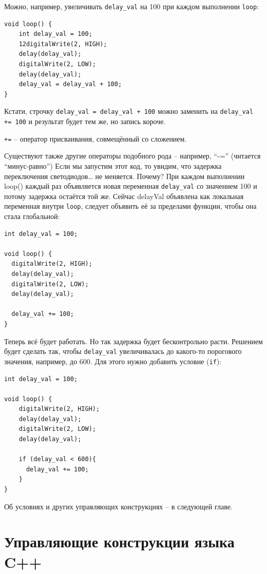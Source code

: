 \documentclass[a4paper,twoside]{book}
\begin{document}
Можно, например, увеличивать \texttt{delay\_val} на 100 при каждом выполнении
\texttt{loop}:

\begin{verbatim}
void loop() {
    int delay_val = 100;
    12digitalWrite(2, HIGH);
    delay(delay_val);
    digitalWrite(2, LOW);
    delay(delay_val);
    delay_val = delay_val + 100;
}
\end{verbatim}

Кстати, строчку \texttt{delay\_val = delay\_val + 100} можно заменить на
\texttt{delay\_val += 100} и результат будет тем же, но запись короче.

\texttt{+=} -- оператор присваивания, совмещённый со сложением.

Существуют также другие операторы подобного рода -- например, ``-=''
(читается ``минус-равно'') Если мы запустим этот код, то увидим, что задержка
переключения светодиодов… не меняется. Почему? При каждом выполнении loop()
каждый раз объявляется новая переменная \texttt{delay\_val} со значением 100 и
потому задержка остаётся той же. Сейчас delayVal объявлена как локальная
переменная внутри \texttt{loop}, следует объявить её за пределами функции, чтобы
она стала глобальной:

\begin{verbatim}
int delay_val = 100;

void loop() {
  digitalWrite(2, HIGH);
  delay(delay_val);
  digitalWrite(2, LOW);
  delay(delay_val);

  delay_val += 100;
}
\end{verbatim}

Теперь всё будет работать. Но так задержка будет бесконтрольно расти. Решением
будет сделать так, чтобы \texttt{delay\_val} увеличивалась до какого-то
порогового значения, например, до 600. Для этого нужно добавить условие
(\texttt{if}):

\begin{verbatim}
int delay_val = 100;

void loop() {
    digitalWrite(2, HIGH);
    delay(delay_val);
    digitalWrite(2, LOW);
    delay(delay_val);

    if (delay_val < 600){
      delay_val += 100;
    }
}
\end{verbatim}

Об условиях и других управляющих конструкциях -- в следующей главе.

\chapter{Управляющие конструкции языка C++}
\end{document}
